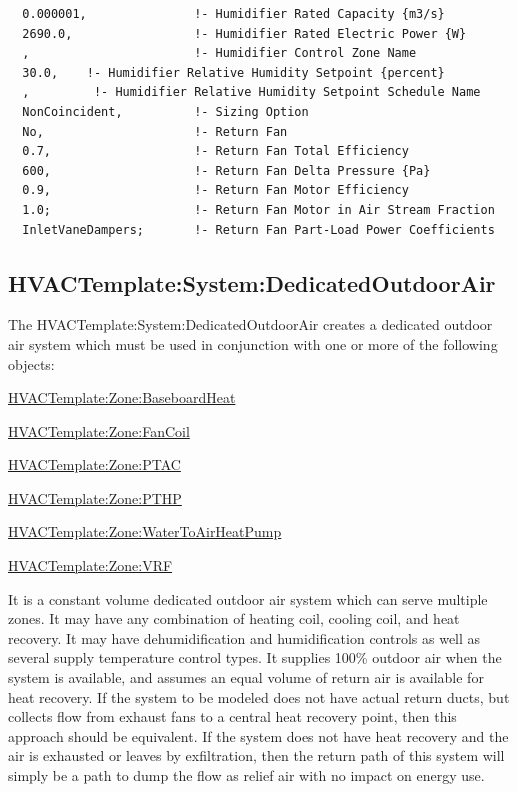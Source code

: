 \begin{lstlisting}
  0.000001,               !- Humidifier Rated Capacity {m3/s}
  2690.0,                 !- Humidifier Rated Electric Power {W}
  ,                       !- Humidifier Control Zone Name
  30.0,    !- Humidifier Relative Humidity Setpoint {percent}
  ,         !- Humidifier Relative Humidity Setpoint Schedule Name
  NonCoincident,          !- Sizing Option
  No,                     !- Return Fan
  0.7,                    !- Return Fan Total Efficiency
  600,                    !- Return Fan Delta Pressure {Pa}
  0.9,                    !- Return Fan Motor Efficiency
  1.0;                    !- Return Fan Motor in Air Stream Fraction
  InletVaneDampers;       !- Return Fan Part-Load Power Coefficients
\end{lstlisting}

\subsection{HVACTemplate:System:DedicatedOutdoorAir}\label{hvactemplatesystemdedicatedoutdoorair}

The HVACTemplate:System:DedicatedOutdoorAir creates a dedicated outdoor air system which must be used in conjunction with one or more of the following objects:

\hyperref[hvactemplatezonebaseboardheat]{HVACTemplate:Zone:BaseboardHeat}

\hyperref[hvactemplatezonefancoil]{HVACTemplate:Zone:FanCoil}

\hyperref[hvactemplatezoneptac]{HVACTemplate:Zone:PTAC}

\hyperref[hvactemplatezonepthp]{HVACTemplate:Zone:PTHP}

\hyperref[hvactemplatezonewatertoairheatpump]{HVACTemplate:Zone:WaterToAirHeatPump}

\hyperref[hvactemplatezonevrf]{HVACTemplate:Zone:VRF}

It is a constant volume dedicated outdoor air system which can serve multiple zones. It may have any combination of heating coil, cooling coil, and heat recovery. It may have dehumidification and humidification controls as well as several supply temperature control types. It supplies 100\% outdoor air when the system is available, and assumes an equal volume of return air is available for heat recovery. If the system to be modeled does not have actual return ducts, but collects flow from exhaust fans to a central heat recovery point, then this approach should be equivalent. If the system does not have heat recovery and the air is exhausted or leaves by exfiltration, then the return path of this system will simply be a path to dump the flow as relief air with no impact on energy use.

